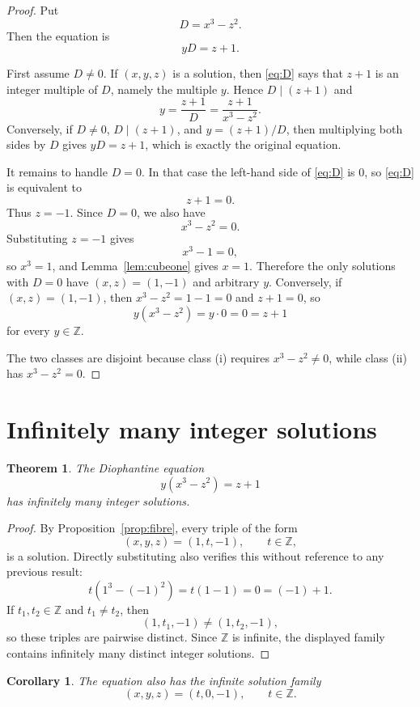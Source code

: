 \documentclass[11pt]{article}
\newtheorem{theorem}{Theorem}
\newtheorem{corollary}{Corollary}
\theoremstyle{remark}
\newcommand{\Z}{\mathbb{Z}}
\begin{document}
\begin{proof}
Put
\[
        D=x^3-z^2.
\]
Then the equation is
\begin{equation}\label{eq:D}
        yD=z+1.
\end{equation}

First assume $D\ne 0$.  If $(x,y,z)$ is a solution, then \eqref{eq:D} says
that $z+1$ is an integer multiple of $D$, namely the multiple $y$.  Hence
$D\mid (z+1)$ and
\[
        y=\frac{z+1}{D}=\frac{z+1}{x^3-z^2}.
\]
Conversely, if $D\ne 0$, $D\mid(z+1)$, and
$y=(z+1)/D$, then multiplying both sides by $D$ gives $yD=z+1$, which is
exactly the original equation.

It remains to handle $D=0$.  In that case the left-hand side of
\eqref{eq:D} is $0$, so \eqref{eq:D} is equivalent to
\[
        z+1=0.
\]
Thus $z=-1$.  Since $D=0$, we also have
\[
        x^3-z^2=0.
\]
Substituting $z=-1$ gives
\[
        x^3-1=0,
\]
so $x^3=1$, and Lemma~\ref{lem:cubeone} gives $x=1$.  Therefore the only
solutions with $D=0$ have $(x,z)=(1,-1)$ and arbitrary $y$.
Conversely, if $(x,z)=(1,-1)$, then $x^3-z^2=1-1=0$ and $z+1=0$, so
\[
        y(x^3-z^2)=y\cdot 0=0=z+1
\]
for every $y\in\Z$.

The two classes are disjoint because class (i) requires $x^3-z^2\ne 0$, while
class (ii) has $x^3-z^2=0$.
\end{proof}

\section{Infinitely many integer solutions}

\begin{theorem}\label{thm:infinite}
The Diophantine equation
\[
        y(x^3-z^2)=z+1
\]
has infinitely many integer solutions.
\end{theorem}

\begin{proof}
By Proposition~\ref{prop:fibre}, every triple of the form
\[
        (x,y,z)=(1,t,-1), \qquad t\in\Z,
\]
is a solution.  Directly substituting also verifies this without reference to
any previous result:
\[
        t(1^3-(-1)^2)=t(1-1)=0=(-1)+1.
\]
If $t_1,t_2\in\Z$ and $t_1\ne t_2$, then
\[
        (1,t_1,-1)\ne (1,t_2,-1),
\]
so these triples are pairwise distinct.  Since $\Z$ is infinite, the displayed
family contains infinitely many distinct integer solutions.
\end{proof}

\begin{corollary}
The equation also has the infinite solution family
\[
        (x,y,z)=(t,0,-1),\qquad t\in\Z.
\]
\end{corollary}
\end{document}
